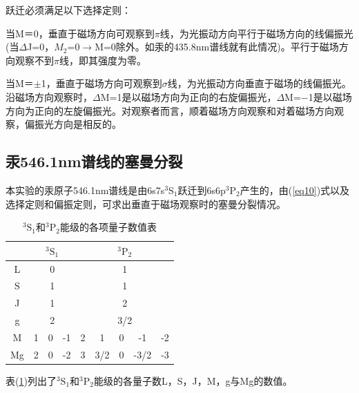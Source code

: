 \documentclass[a4paper]{article}
\begin{document}
跃迁必须满足以下选择定则：

当M＝0，垂直于磁场方向可观察到$\pi$线，为光振动方向平行于磁场方向的线偏振光(当$\Delta$J=0，$M_2$=0$\to$M=0除外。如汞的435.8nm谱线就有此情况)。平行于磁场方向观察不到$\pi$线，即其强度为零。

当M＝$\pm$1，垂直于磁场方向可观察到$\sigma$线，为光振动方向垂直于磁场的线偏振光。沿磁场方向观察时，$\Delta$M=1是以磁场方向为正向的右旋偏振光，$\Delta$M=$-$1是以磁场方向为正向的左旋偏振光。对观察者而言，顺着磁场方向观察和对着磁场方向观察，偏振光方向是相反的。
\subsection{汞546.1nm谱线的塞曼分裂}
本实验的汞原子546.1nm谱线是由6s7s$^3$S$_1$跃迁到6s6p$^3$P$_2$产生的，由(\ref{eq10})式以及选择定则和偏振定则，可求出垂直于磁场观察时的塞曼分裂情况。
\begin{table}[!h]
\centering
\caption{$^3\text{S}_1$和$^3\text{P}_2$能级的各项量子数值表}\label{table1}
\begin{tabular}{|c|c|c|c|c|c|c|c|c|}
\hline
   & \multicolumn{3}{c|}{$^3\text{S}_1$} & \multicolumn{5}{c|}{$^3\text{P}_2$} \\ \hline
L  & \multicolumn{3}{c|}{0}              & \multicolumn{5}{c|}{1}              \\ \hline
S  & \multicolumn{3}{c|}{1}              & \multicolumn{5}{c|}{1}              \\ \hline
J  & \multicolumn{3}{c|}{1}              & \multicolumn{5}{c|}{2}              \\ \hline
g  & \multicolumn{3}{c|}{2}              & \multicolumn{5}{c|}{3/2}            \\ \hline
M  & 1          & 0         & -1         & 2    & 1      & 0   & -1     & -2   \\ \hline
Mg & 2          & 0         & -2         & 3    & 3/2    & 0   & -3/2   & -3   \\ \hline
\end{tabular}
\end{table}
表(\ref{table1})列出了$^3\text{S}_1$和$^3\text{P}_2$能级的各量子数L，S，J，M，g与Mg的数值。
\end{document}
